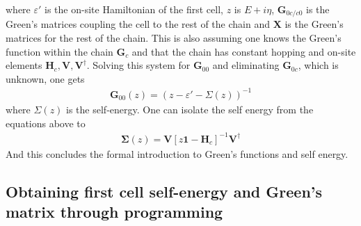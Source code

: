where \(\varepsilon'\) is the on-site Hamiltonian of the first cell, \(z\) is \(E+i\eta\),  \(\mathbf{G}_{0c/c0}\) is the Green's matrices coupling the cell to the rest of the chain and \(\mathbf{X}\) is the Green's matrices for the rest of the chain. This is also assuming one knows the Green's function within the chain \(\mathbf{G}_c\) and that the chain has constant hopping and on-site elements \(\mathbf{H}_c,\mathbf{V},\mathbf{V}^{\dagger}\).
Solving this system for \(\mathbf{G}_{00}\) and eliminating \(\mathbf{G}_{0c}\), which is unknown, one gets
\begin{align}\label{greenszero}
	\mathbf{G}_{00}(z) = (z-\varepsilon'-\Sigma(z))^{-1}
\end{align}
where \(\Sigma(z)\) is the self-energy. One can isolate the self energy from the equations above to
\begin{align}
	\mathbf{\Sigma}(z) = \mathbf{V}[z\mathbf{1}-\mathbf{H}_c]^{-1}\mathbf{V}^{\dagger}
\end{align}
And this concludes the formal introduction to Green's functions and self energy.\subsection{Obtaining first cell self-energy and Green's matrix through programming}\label{recursionroutinesec}
